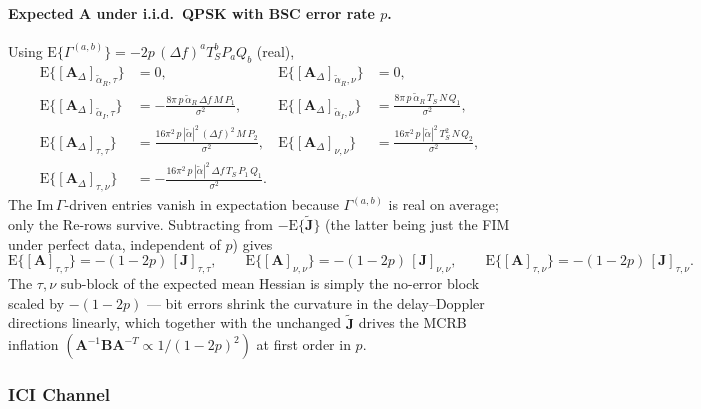 \documentclass[11pt]{article}
\begin{document}
\paragraph{Expected \(\bm{A}\) under i.i.d.\ QPSK with BSC error rate \(p\).} Using \(\mathrm{E}\{\Gamma^{(a,b)}\} = -2p\, (\Delta f)^a T_S^b P_a Q_b\) (real),
\begin{align}
    \mathrm{E}\{[\bm{A}_\Delta]_{\tilde{\alpha}_R, \tau}\} &= 0, &
    \mathrm{E}\{[\bm{A}_\Delta]_{\tilde{\alpha}_R, \nu}\} &= 0, \\
    \mathrm{E}\{[\bm{A}_\Delta]_{\tilde{\alpha}_I, \tau}\} &= -\tfrac{8\pi\, p\, \tilde{\alpha}_R\, \Delta f\, M\, P_1}{\sigma^2}, &
    \mathrm{E}\{[\bm{A}_\Delta]_{\tilde{\alpha}_I, \nu}\} &= \tfrac{8\pi\, p\, \tilde{\alpha}_R\, T_S\, N\, Q_1}{\sigma^2}, \\
    \mathrm{E}\{[\bm{A}_\Delta]_{\tau, \tau}\} &= \tfrac{16\pi^2\, p\, |\tilde{\alpha}|^2\, (\Delta f)^2\, M\, P_2}{\sigma^2}, &
    \mathrm{E}\{[\bm{A}_\Delta]_{\nu, \nu}\} &= \tfrac{16\pi^2\, p\, |\tilde{\alpha}|^2\, T_S^2\, N\, Q_2}{\sigma^2}, \\
    \mathrm{E}\{[\bm{A}_\Delta]_{\tau, \nu}\} &= -\tfrac{16\pi^2\, p\, |\tilde{\alpha}|^2\, \Delta f\, T_S\, P_1\, Q_1}{\sigma^2}. & &
\end{align}
The \(\mathrm{Im}\,\Gamma\)-driven entries vanish in expectation because \(\Gamma^{(a,b)}\) is real on average; only the \(\mathrm{Re}\)-rows survive. Subtracting from \(-\mathrm{E}\{\tilde{\bm{J}}\}\) (the latter being just the FIM under perfect data, independent of \(p\)) gives
\begin{equation}
    \mathrm{E}\{[\bm{A}]_{\tau,\tau}\} = -(1-2p)\, [\bm{J}]_{\tau, \tau}, \qquad \mathrm{E}\{[\bm{A}]_{\nu,\nu}\} = -(1-2p)\, [\bm{J}]_{\nu, \nu}, \qquad \mathrm{E}\{[\bm{A}]_{\tau,\nu}\} = -(1-2p)\, [\bm{J}]_{\tau, \nu}.
\end{equation}
The \(\tau, \nu\) sub-block of the expected mean Hessian is simply the no-error block scaled by \(-(1-2p)\) — bit errors shrink the curvature in the delay--Doppler directions linearly, which together with the unchanged \(\tilde{\bm{J}}\) drives the MCRB inflation \((\bm{A}^{-1}\bm{B}\bm{A}^{-T} \propto 1/(1-2p)^2)\) at first order in \(p\).

\subsubsection{ICI Channel}
\end{document}
